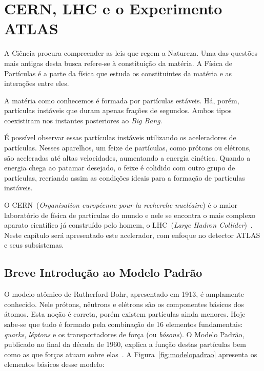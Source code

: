 \chapter{CERN, LHC e o Experimento ATLAS}

A Ciência procura compreender as leis que regem a Natureza. Uma das questões
mais antigas desta busca refere-se à constituição da matéria. A Física de
Partículas é a parte da física que estuda os constituintes da matéria e as
interações entre eles.

A matéria como conhecemos é formada por partículas estáveis. Há, porém,
partículas instáveis que duram apenas frações de segundos. Ambos tipos
coexistiram nos instantes posteriores ao \emph{Big Bang}.

É possível observar essas partículas instáveis utilizando os aceleradores de
partículas. Nesses aparelhos, um feixe de partículas, como prótons ou elétrons,
são aceleradas até altas velocidades, aumentando a energia cinética.  Quando a
energia chega ao patamar desejado, o feixe é colidido com outro grupo de
partículas, recriando assim as condições ideais para a formação de partículas
instáveis.

O CERN~(\emph{Organisation européenne pour la recherche nucléaire}) é o maior
laboratório de física de partículas do mundo e nele se encontra o mais complexo
aparato científico já construído pelo homem, o LHC~(\emph{Large Hadron
Collider})~\cite{EVANS2008}. Neste capítulo será apresentado este acelerador,
com enfoque no detector ATLAS e seus subsistemas.

\section{Breve Introdução ao Modelo Padrão}

O modelo atômico de Rutherford-Bohr, apresentado em 1913, é amplamente
conhecido. Nele prótons, nêutrons e elétrons são os componentes básicos dos
átomos. Esta noção é correta, porém existem partículas ainda menores. Hoje
sabe-se que tudo é formado pela combinação de 16 elementos fundamentais:
\emph{quarks}, \emph{léptons} e os transportadores de força (ou \emph{bósons}).
O Modelo Padrão, publicado no final da década de 1960, explica a função destas
partículas bem como as que forças atuam sobre elas~\cite{GRIFFITHS2008}. A
Figura~\ref{fig:modelopadrao} apresenta os elementos básicos desse modelo:


